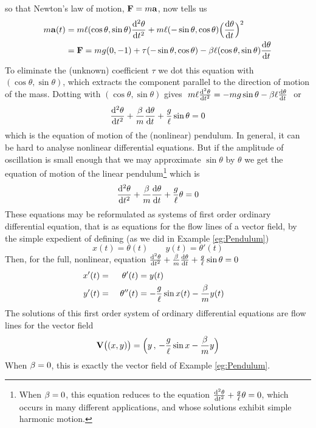 so that Newton's law of motion, $\mathbf{F}=m\mathbf{a}$,  now tells us
\begin{align*}
m\va(t) &= m\ell(\cos\theta,\sin\theta)\difftwo{\theta}{t}
+m\ell(-\sin\theta,\cos\theta)\Big(\diff{\theta}{t}\Big)^2\\
&=\vF=mg(0,-1)+\tau (-\sin\theta,\cos\theta)
-\be \ell(\cos\theta,\sin\theta)\diff{\theta}{t}
\end{align*}
To eliminate the (unknown) coefficient $\tau$ we dot this equation with
$(\cos\theta,\sin\theta)$, which extracts 
the component parallel to the direction of motion of the 
mass. Dotting with $(\cos\theta,\sin\theta)$ gives
$\ 
m\ell\difftwo{\theta}{t}=-mg\sin\theta-\be \ell\diff{\theta}{t}
\ $
or
\begin{equation*}
\difftwo{\theta}{t}+\frac{\be}{m}\diff{\theta}{t}
              +\frac{g}{\ell}\sin\theta=0
\end{equation*}
which is the equation of motion of the (nonlinear) pendulum. 
In general, it can be hard to analyse nonlinear differential 
equations. But if the amplitude of oscillation is small enough 
that we may approximate 
$\sin\theta$ by $\theta$ we get the equation of motion 
of the linear pendulum\footnote{When $\beta=0$, this equation reduces
to the equation $\difftwo{\theta}{t}+\frac{g}{\ell}\theta=0$, which occurs 
in many different applications, and whose solutions exhibit simple 
harmonic motion.} which is 
\begin{align*}
\difftwo{\theta}{t}+\frac{\be}{m}\diff{\theta}{t}
+\frac{g}{\ell}\theta=0
\end{align*}
These equations may be reformulated as systems of first order 
ordinary differential equation, that is as equations for the 
flow lines of a vector field, by the simple expedient of 
defining (as we did in Example \ref{eg:Pendulum})
\begin{equation*}
x(t)=\theta(t)\qquad y(t)=\theta'(t)
\end{equation*}
Then, for the full, nonlinear, equation 
$ \difftwo{\theta}{t}+\frac{\be}{m}\diff{\theta}{t}
+\frac{g}{\ell}\sin\theta=0$
\begin{alignat*}{3}
x'(t)&=&\theta'(t)&=y(t)\cr
y'(t)&=&\ \theta''(t)&=-\frac{g}{\ell}\sin x(t)-\frac{\beta}{m} y(t)
\end{alignat*}
The solutions of this first order system of ordinary differential equations
are flow lines for the vector field
\begin{equation*}
\mathbf{V}\big((x,y)\big)=\Big(y\,,\,-\frac{g}{\ell}\sin x-\frac{\beta}{m} y\Big)
\end{equation*}
When $\beta=0$, this is exactly the vector field of Example \ref{eg:Pendulum}.











